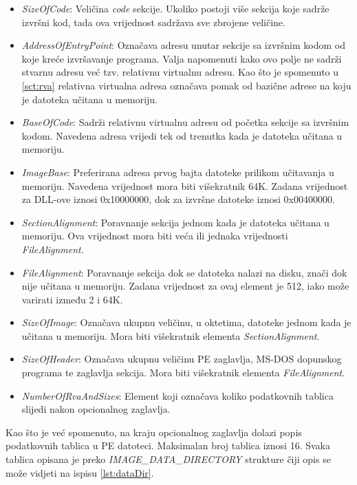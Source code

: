 \documentclass[times, utf8, diplomski, numeric]{fer}
\begin{document}
\begin{itemize}
\item \emph{SizeOfCode}: Veličina \emph{code} sekcije. Ukoliko
postoji više sekcija koje sadrže izvršni kod, tada ova vrijednost
sadržava sve zbrojene veličine.

\item \emph{AddressOfEntryPoint}: Označava adresu unutar sekcije
sa izvršnim kodom od koje kreće izvršavanje programa. Valja
napomenuti kako ovo polje ne sadrži stvarnu adresu već tzv.
relativnu virtualnu adresu. Kao što je spomenuto u \ref{sct:rva} 
relativna virtualna adresa označava pomak od bazične adrese na
koju je datoteka učitana u memoriju.

\item \emph{BaseOfCode}: Sadrži relativnu virtualnu adresu od
početka sekcije sa izvršnim kodom. Navedena adresa vrijedi tek od
trenutka kada je datoteka učitana u memoriju.

\item \emph{ImageBase}: Preferirana adresa prvog bajta datoteke
prilikom učitavanja u memoriju. Navedena vrijednost mora biti
višekratnik 64K. Zadana vrijednost za DLL-ove iznosi 0x10000000,
dok za izvršne datoteke iznosi 0x00400000.

\item \emph{SectionAlignment}: Poravnanje sekcija jednom kada je
datoteka učitana u memoriju. Ova vrijednost mora biti veća ili
jednaka vrijednosti \emph{FileAlignment}.

\item \emph{FileAlignment}: Poravnanje sekcija dok se datoteka
nalazi na disku, znači dok nije učitana u memoriju. Zadana
vrijednost za ovaj element je 512, iako može varirati između 2 i
64K.

\item \emph{SizeOfImage}: Označava ukupnu veličinu, u oktetima,
datoteke jednom kada je učitana u memoriju. Mora biti višekratnik
elementa \emph{SectionAlignment}.

\item \emph{SizeOfHeader}: Označava ukupnu veličinu PE zaglavlja,
MS-DOS dopunskog programa te zaglavlja sekcija. Mora biti
višekratnik elementa \emph{FileAlignment}.

\item \emph{NumberOfRvaAndSizes}: Element koji označava koliko
podatkovnih tablica slijedi nakon opcionalnog zaglavlja.
\end{itemize}

Kao što je već spomenuto, na kraju opcionalnog zaglavlja dolazi popis podatkovnih tablica u PE datoteci. Maksimalan broj tablica iznosi 16. Svaka tablica opisana je preko \emph{IMAGE\_DATA\_DIRECTORY} strukture čiji opis se može vidjeti na ispisu \ref{lst:dataDir}.
\end{document}
